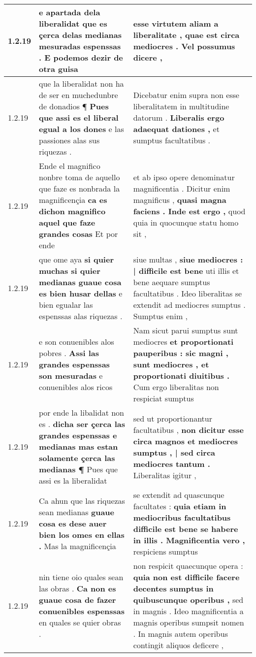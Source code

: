 \begin{tabular}{|p{1cm}|p{6.5cm}|p{6.5cm}|}
1.2.19 & e apartada dela liberalidat \textbf{ que es çerca delas medianas mesuradas espenssas . } E podemos dezir de otra guisa & esse virtutem aliam a liberalitate , \textbf{ quae est circa mediocres . } Vel possumus dicere , \\\hline
1.2.19 & que la liberalidat non ha de ser en muchedunbre de donadios ¶ \textbf{ Pues que assi es el liberal egual a los dones } e las passiones alas sus riquezas . & Dicebatur enim supra non esse liberalitatem in multitudine datorum . \textbf{ Liberalis ergo adaequat dationes , } et sumptus facultatibus . \\\hline
1.2.19 & Ende el magnifico nonbre toma de aquello que faze es nonbrada la magnificençia \textbf{ ca es dichon magnifico aquel que faze grandes cosas } Et por ende & et ab ipso opere denominatur magnificentia . Dicitur enim magnificus , \textbf{ quasi magna faciens . Inde est ergo , } quod quia in quocunque statu homo sit , \\\hline
1.2.19 & que ome aya \textbf{ si quier muchas si quier medianas guaue cosa es bien husar dellas } e bien egualar las espenssas alas riquezas . & siue multas , \textbf{ siue mediocres : | difficile est bene } uti illis et bene aequare sumptus facultatibus . Ideo liberalitas se extendit ad mediocres sumptus . Sumptus enim , \\\hline
1.2.19 & e son conuenibles alos pobres . \textbf{ Assi las grandes espenssas son mesuradas } e conuenibles alos ricos & Nam sicut parui sumptus sunt mediocres \textbf{ et proportionati pauperibus : sic magni , sunt mediocres , et proportionati diuitibus . } Cum ergo liberalitas non respiciat sumptus \\\hline
1.2.19 & por ende la libalidat non es . \textbf{ dicha ser çerca las grandes espenssas e medianas mas estan solamente çerca las medianas ¶ } Pues que assi es la liberalidat & sed ut proportionantur facultatibus , \textbf{ non dicitur esse circa magnos et mediocres sumptus , | sed circa mediocres tantum . } Liberalitas igitur , \\\hline
1.2.19 & Ca ahun que las riquezas sean medianas \textbf{ guaue cosa es dese auer bien los omes en ellas . } Mas la magnificençia & se extendit ad quascunque facultates : \textbf{ quia etiam in mediocribus facultatibus difficile est bene se habere in illis . Magnificentia vero , } respiciens sumptus \\\hline
1.2.19 & nin tiene oio quales sean las obras . \textbf{ Ca non es guaue cosa de fazer conuenibles espenssas } en quales se quier obras . & non respicit quaecunque opera : \textbf{ quia non est difficile facere decentes sumptus in quibuscunque operibus , } sed in magnis . Ideo magnificentia a magnis operibus sumpsit nomen . In magnis autem operibus contingit aliquos deficere , \\\hline

\end{tabular}
